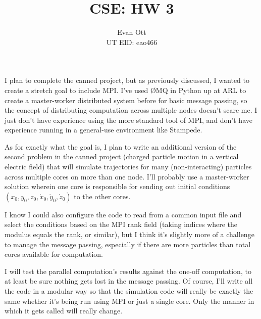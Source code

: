 \documentclass{article}
\title{\vspace{-6ex}CSE: HW 3\vspace{-2ex}}
\author{Evan Ott \\ UT EID: eao466\vspace{-2ex}}
\begin{document}
\maketitle

I plan to complete the canned project, but as previously discussed, I wanted to create a stretch goal to include MPI. 
I've used {\O}MQ in Python up at ARL to create a master-worker distributed system before for basic message passing,
so the concept of distributing computation across multiple nodes doesn't scare me. I just don't have experience using 
the more standard tool of MPI, and don't have experience running in a general-use environment like Stampede.

As for exactly what the goal is, I plan to write an additional version of the second problem in the canned project 
(charged particle motion in a vertical electric field) that will simulate trajectories for many (non-interacting)
particles across multiple
cores on more than one node. I'll probably use a master-worker solution wherein one core is responsible for
sending out initial conditions $(x_0, y_0, z_0, \dot{x}_0, \dot{y}_0, \dot{z}_0)$ to the other cores.

I know I could also configure the code to read from a common input file and select the conditions based on the
MPI rank field (taking indices where the modulus equals the rank, or similar), but I think it's slightly more of a
challenge to manage the message passing, especially
if there are more particles than total cores available for computation.

I will test the parallel computation's results against the one-off computation, to at least be sure nothing
gets lost in the message passing. Of course, I'll write all the code in a modular way so that the simulation code
will really be exactly the same whether it's being run using MPI or just a single core. Only the manner in which
it gets called will really change.

%
%

\end{document}
